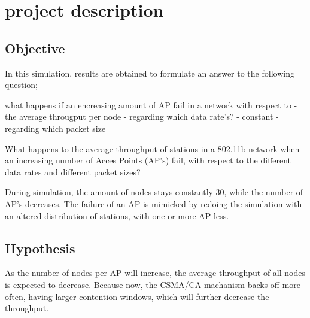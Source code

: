 \chapter{project description}

\section{Objective} 

In this simulation, results are obtained to formulate an answer to the following question; 

	what happens if an encreasing amount of AP fail in a network with respect to
	- the average througput per node
	- regarding which data rate's? 
	- constant
	- regarding which packet size
	
What happens to the average throughput of stations in a 802.11b network when an increasing number of Acces Points (AP's) fail, with
respect to the different data rates and different packet sizes?

During simulation, the amount of nodes stays constantly 30, while the number of AP's decreases. The failure of an AP is mimicked by 
redoing the simulation with an altered distribution of stations, with one or more AP less. 

\section{Hypothesis}
As the number of nodes per AP will increase, the average throughput of all nodes is expected to decrease. Because now, the CSMA/CA machanism backs off more often,
having larger contention windows, which will further decrease the throughput.   